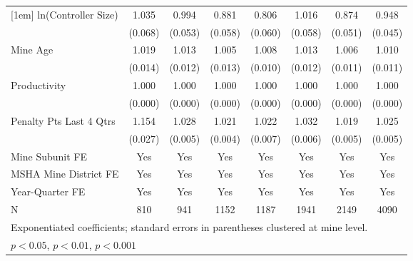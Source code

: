 {\begin{tabular}{l*{7}{c}}
[1em]
ln(Controller Size)      &       1.035         &       0.994         &       0.881         &       0.806\sym{**} &       1.016         &       0.874\sym{*}  &       0.948         \\
                         &     (0.068)         &     (0.053)         &     (0.058)         &     (0.060)         &     (0.058)         &     (0.051)         &     (0.045)         \\
[1em]
Mine Age                 &       1.019         &       1.013         &       1.005         &       1.008         &       1.013         &       1.006         &       1.010         \\
                         &     (0.014)         &     (0.012)         &     (0.013)         &     (0.010)         &     (0.012)         &     (0.011)         &     (0.011)         \\
[1em]
Productivity             &       1.000         &       1.000         &       1.000         &       1.000         &       1.000         &       1.000         &       1.000\sym{*}  \\
                         &     (0.000)         &     (0.000)         &     (0.000)         &     (0.000)         &     (0.000)         &     (0.000)         &     (0.000)         \\
[1em]
Penalty Pts Last 4 Qtrs  &       1.154\sym{***}&       1.028\sym{***}&       1.021\sym{***}&       1.022\sym{**} &       1.032\sym{***}&       1.019\sym{***}&       1.025\sym{***}\\
                         &     (0.027)         &     (0.005)         &     (0.004)         &     (0.007)         &     (0.006)         &     (0.005)         &     (0.005)         \\
[1em]
Mine Subunit FE          &         Yes         &         Yes         &         Yes         &         Yes         &         Yes         &         Yes         &         Yes         \\
[1em]
MSHA Mine District FE    &         Yes         &         Yes         &         Yes         &         Yes         &         Yes         &         Yes         &         Yes         \\
[1em]
Year-Quarter FE          &         Yes         &         Yes         &         Yes         &         Yes         &         Yes         &         Yes         &         Yes         \\
\hline
N                        &         810         &         941         &        1152         &        1187         &        1941         &        2149         &        4090         \\
\hline\hline
\multicolumn{8}{l}{\footnotesize Exponentiated coefficients; standard errors in parentheses clustered at mine level.}\\
\multicolumn{8}{l}{\footnotesize \sym{*} \(p<0.05\), \sym{**} \(p<0.01\), \sym{***} \(p<0.001\)}\\
\end{tabular}
}
